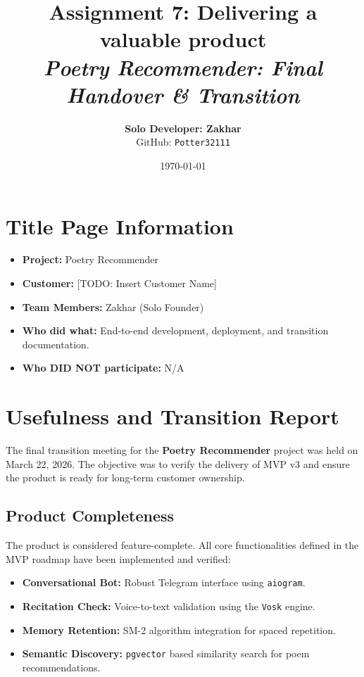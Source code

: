 \documentclass[12pt]{article}
\title{
    \huge \textbf{Assignment 7: Delivering a valuable product} \\
    \vspace{0.5cm}
    \large \textit{Poetry Recommender: Final Handover \& Transition}
}
\author{
    \textbf{Solo Developer: Zakhar} \\
    GitHub: \texttt{Potter32111}
}
\date{\today}
\begin{document}
\maketitle

\section*{Title Page Information}
\begin{itemize}
    \item \textbf{Project:} Poetry Recommender
    \item \textbf{Customer:} [TODO: Insert Customer Name]
    \item \textbf{Team Members:} Zakhar (Solo Founder)
    \item \textbf{Who did what:} End-to-end development, deployment, and transition documentation.
    \item \textbf{Who DID NOT participate:} N/A
\end{itemize}

\newpage

\section{Usefulness and Transition Report}

The final transition meeting for the \textbf{Poetry Recommender} project was held on March 22, 2026. The objective was to verify the delivery of MVP v3 and ensure the product is ready for long-term customer ownership.

\subsection{Product Completeness}
The product is considered feature-complete. All core functionalities defined in the MVP roadmap have been implemented and verified:
\begin{itemize}
    \item \textbf{Conversational Bot:} Robust Telegram interface using \texttt{aiogram}.
    \item \textbf{Recitation Check:} Voice-to-text validation using the \texttt{Vosk} engine.
    \item \textbf{Memory Retention:} SM-2 algorithm integration for spaced repetition.
    \item \textbf{Semantic Discovery:} \texttt{pgvector} based similarity search for poem recommendations.
\end{itemize}
\end{document}
